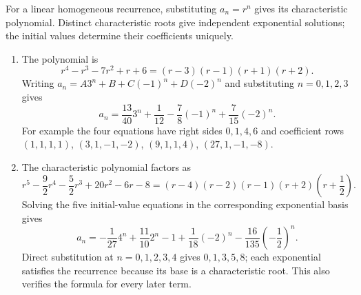 For a linear homogeneous recurrence, substituting $a_n=r^n$ gives its characteristic polynomial. Distinct characteristic roots give independent exponential solutions; the initial values determine their coefficients uniquely.
\begin{enumerate}
\item The polynomial is
\[
r^4-r^3-7r^2+r+6=(r-3)(r-1)(r+1)(r+2).
\]
Writing $a_n=A3^n+B+C(-1)^n+D(-2)^n$ and substituting $n=0,1,2,3$ gives
\[
\boxed{a_n=\dfrac{13}{40}3^n+\dfrac{1}{12}-\dfrac{7}{8}(-1)^n+\dfrac{7}{15}(-2)^n.}
\]
For example the four equations have right sides $0,1,4,6$ and coefficient rows $(1,1,1,1)$, $(3,1,-1,-2)$, $(9,1,1,4)$, $(27,1,-1,-8)$.
\item The characteristic polynomial factors as
\[
r^5-\dfrac{9}{2}r^4-\dfrac{5}{2}r^3+20r^2-6r-8
=(r-4)(r-2)(r-1)(r+2)(r+\dfrac{1}{2}).
\]
Solving the five initial-value equations in the corresponding exponential basis gives
\[
\boxed{a_n=-\dfrac{1}{27}4^n+\dfrac{11}{10}2^n-1+\dfrac{1}{18}(-2)^n-\dfrac{16}{135}(-\dfrac{1}{2})^n.}
\]
Direct substitution at $n=0,1,2,3,4$ gives $0,1,3,5,8$; each exponential satisfies the recurrence because its base is a characteristic root. This also verifies the formula for every later term.
\end{enumerate}
